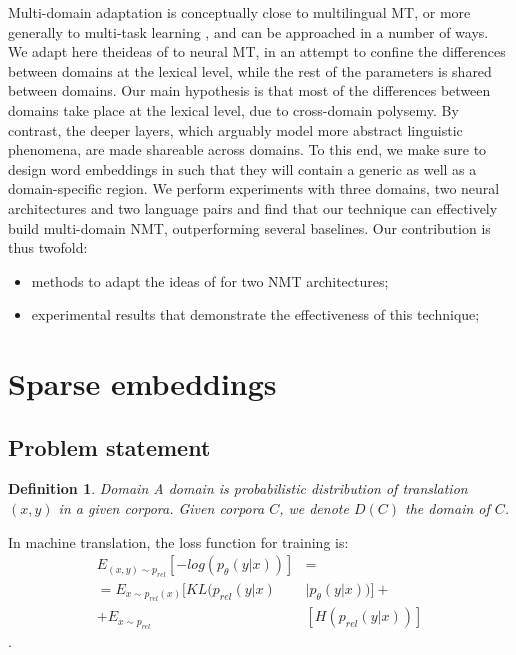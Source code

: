 \documentclass[11pt,a4paper]{article}
\newtheorem{definition}{Definition}[section]
\newcommand{\fyTodo}[1]{\Todo[FY:]{\textcolor{orange}{#1}}}
\newcommand{\fyDone}[1]{\done[FY]\Todo[FY:]{\textcolor{orange}{#1}}}
\begin{document}
Multi-domain adaptation is conceptually close to multilingual MT, or more generally to multi-task learning \cite{Caruana97multitask}, and can be approached in a number of ways. We adapt here theideas of \cite{Daume07frustratingly} to neural MT, in an attempt to confine the differences between domains at the lexical level, while the rest of the parameters is shared between domains. Our main hypothesis is that most of the differences between domains take place at the lexical level, due to cross-domain polysemy. By contrast, the deeper layers, which arguably model more abstract linguistic phenomena, are made shareable across domains.
To this end, we make sure to design word embeddings in such that they will contain a generic as well as a domain-specific region. We perform experiments with three domains, two neural architectures and two language pairs and find that our technique can effectively build multi-domain NMT, outperforming several baselines. Our contribution is thus twofold:
\begin{itemize}
\item methods to adapt the ideas of \cite{Daume07frustratingly} for two NMT architectures;
\item experimental results that demonstrate the effectiveness of this technique;
\end{itemize}
\fyTodo{can we train in random order ? can we get away with catastrophic forgetting ?}
\fyTodo{how to analyze the embeddings ? how can we test or claim ?}

\section{Sparse embeddings \label{sec:sparse_embeddings}}
\fyDone{Use meaningful titles throughout}

\subsection{Problem statement}
\fyTodo{Use math for notation, label equations and such}
\begin{definition}{Domain}
\label{def:domain}
A domain is probabilistic distribution of translation $(x,y)$ in a given corpora. Given corpora $C$, we denote $D(C)$ the domain of $C$.
\end{definition}
\fyTodo{We need more: the source, the target, etc}
In machine translation, the loss function for training is:
\begin{equation}\label{eq:1}
\begin{split}
E_{(x,y) \sim p_{rel}}[-log(p_{\theta}(y|x))] &= \\
= E_{x \sim p_{rel}(x)}[KL(p_{rel}(y|x) & \mid p_{\theta}(y|x))] + \\
+ E_{x \sim p_{rel}} &[H(p_{rel}(y|x))]
\end{split}
\end{equation}.
\end{document}
